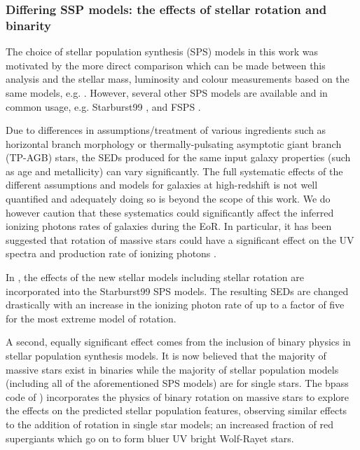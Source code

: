 \subsubsection{Differing SSP models: the effects of stellar rotation and binarity}
The choice of \citet{Bruzual:2003ckb} stellar population synthesis (SPS) models in this work was motivated by the more direct comparison which can be made between this analysis and the stellar mass, luminosity and colour measurements based on the same models, e.g. \citet{2012ApJ...756..164F,Duncan:2014gh}. However, several other SPS models are available and in common usage, e.g. Starburst99 \citep{Leitherer:1999jt}, \citet{Maraston:2005er} and FSPS \citep{Conroy:2009ks,Conroy:2009ja}.

Due to differences in assumptions/treatment of various ingredients such as horizontal branch morphology or thermally-pulsating asymptotic giant branch (TP-AGB) stars, the SEDs produced for the same input galaxy properties (such as age and metallicity) can vary significantly. The full systematic effects of the different assumptions and models for galaxies at high-redshift is not well quantified and adequately doing so is beyond the scope of this work. We do however caution that these systematics could significantly affect the inferred ionizing photons rates of galaxies during the EoR. In particular, it has been suggested that rotation of massive stars could have a significant effect on the UV spectra and production rate of ionizing photons \citep{Vazquez:2007jt}.

In \citet{Leitherer:2014ia}, the effects of the new stellar models including stellar rotation \citep{Ekstrom:2012ke} are incorporated into the Starburst99 SPS models. The resulting SEDs are changed drastically with an increase in the ionizing photon rate of up to a factor of five for the most extreme model of rotation.

A second, equally significant effect comes from the inclusion of binary physics in stellar population synthesis models. It is now believed that the majority of massive stars exist in binaries \citep{Sana:2012gu,Sana:2013hh,Aldoretta:2014un} while the majority of stellar population models (including all of the aforementioned SPS models) are for single stars. The {\sc bpass} code of \citet{Eldridge:2009bi,Eldridge:2011kg}) incorporates the physics of binary rotation on massive stars to explore the effects on the predicted stellar population features, observing similar effects to the addition of rotation in single star models; an increased fraction of red supergiants which go on to form bluer UV bright Wolf-Rayet stars.

